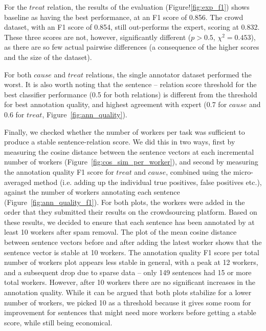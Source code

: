 For the $treat$ relation, the results of the evaluation (Figure!\ref{fig:exp_f1}) shows baseline as having the best performance, at an F1 score of 0.856. The crowd dataset, with an F1 score of 0.854, still out-performs the expert, scoring at 0.832.  These three scores are not, however, significantly different ($p > 0.5$, $ \chi^2 = 0.453 $), as there are so few actual pairwise differences (a consequence of the higher scores and the size of the dataset). 

For both $cause$ and $treat$ relations, the single annotator dataset performed the worst. It is also worth noting that the sentence -- relation score threshold for the best classifier performance (0.5 for both relations) is different from the threshold for best annotation quality, and highest agreement with expert (0.7 for $cause$ and 0.6 for $treat$, Figure~\ref{fig:ann_quality}).

Finally, we checked whether the number of workers per task was sufficient to produce a stable sentence-relation score. We did this in two ways, first by measuring the cosine distance between the sentence vectors at each incremental number of workers (Figure~\ref{fig:cos_sim_per_worker}), and second by measuring the annotation quality F1 score for $treat$ and $cause$, combined using the micro-averaged method (i.e. adding up the individual true positives, false positives etc.), against the number of workers annotating each sentence (Figure~\ref{fig:ann_quality_f1}). For both plots, the workers were added in the order that they submitted their results on the crowdsourcing platform.  Based on these results, we decided to ensure that each sentence has been annotated by at least 10 workers after spam removal.  The plot of the mean cosine distance between sentence vectors before and after adding the latest worker shows that the sentence vector is stable at 10 workers. The annotation quality F1 score per total number of workers plot appears less stable in general, with a peak at 12 workers, and a subsequent drop due to sparse data -- only 149 sentences had 15 or more total workers. However, after 10 workers there are no significant increases in the annotation quality.  While it can be argued that both plots stabilize for a lower number of workers, we picked 10 as a threshold because it gives some room for improvement for sentences that might need more workers before getting a stable score, while still being economical.

